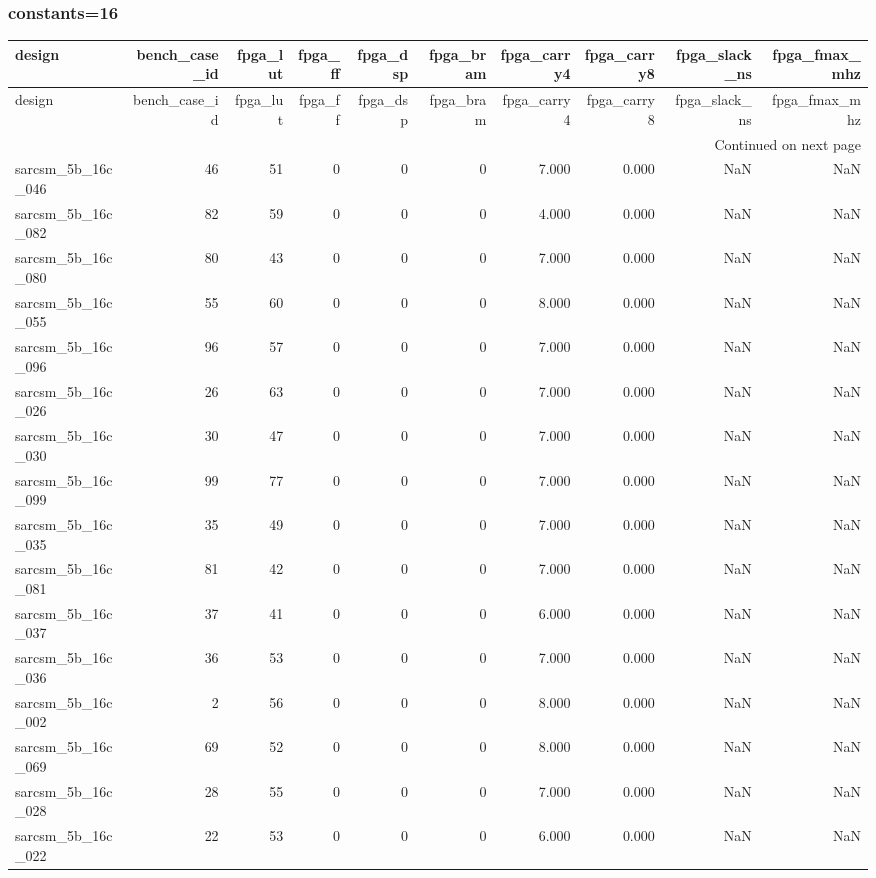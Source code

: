 \documentclass{article}
\begin{document}
\subsubsection*{constants=16}
\begin{longtable}{lrrrrrrrrr}
\toprule
design & bench\_case\_id & fpga\_lut & fpga\_ff & fpga\_dsp & fpga\_bram & fpga\_carry4 & fpga\_carry8 & fpga\_slack\_ns & fpga\_fmax\_mhz \\
\midrule
\endfirsthead
\toprule
design & bench\_case\_id & fpga\_lut & fpga\_ff & fpga\_dsp & fpga\_bram & fpga\_carry4 & fpga\_carry8 & fpga\_slack\_ns & fpga\_fmax\_mhz \\
\midrule
\endhead
\midrule
\multicolumn{10}{r}{Continued on next page} \\
\midrule
\endfoot
\bottomrule
\endlastfoot
sarcsm\_5b\_16c\_046 & 46 & 51 & 0 & 0 & 0 & 7.000 & 0.000 & NaN & NaN \\
sarcsm\_5b\_16c\_082 & 82 & 59 & 0 & 0 & 0 & 4.000 & 0.000 & NaN & NaN \\
sarcsm\_5b\_16c\_080 & 80 & 43 & 0 & 0 & 0 & 7.000 & 0.000 & NaN & NaN \\
sarcsm\_5b\_16c\_055 & 55 & 60 & 0 & 0 & 0 & 8.000 & 0.000 & NaN & NaN \\
sarcsm\_5b\_16c\_096 & 96 & 57 & 0 & 0 & 0 & 7.000 & 0.000 & NaN & NaN \\
sarcsm\_5b\_16c\_026 & 26 & 63 & 0 & 0 & 0 & 7.000 & 0.000 & NaN & NaN \\
sarcsm\_5b\_16c\_030 & 30 & 47 & 0 & 0 & 0 & 7.000 & 0.000 & NaN & NaN \\
sarcsm\_5b\_16c\_099 & 99 & 77 & 0 & 0 & 0 & 7.000 & 0.000 & NaN & NaN \\
sarcsm\_5b\_16c\_035 & 35 & 49 & 0 & 0 & 0 & 7.000 & 0.000 & NaN & NaN \\
sarcsm\_5b\_16c\_081 & 81 & 42 & 0 & 0 & 0 & 7.000 & 0.000 & NaN & NaN \\
sarcsm\_5b\_16c\_037 & 37 & 41 & 0 & 0 & 0 & 6.000 & 0.000 & NaN & NaN \\
sarcsm\_5b\_16c\_036 & 36 & 53 & 0 & 0 & 0 & 7.000 & 0.000 & NaN & NaN \\
sarcsm\_5b\_16c\_002 & 2 & 56 & 0 & 0 & 0 & 8.000 & 0.000 & NaN & NaN \\
sarcsm\_5b\_16c\_069 & 69 & 52 & 0 & 0 & 0 & 8.000 & 0.000 & NaN & NaN \\
sarcsm\_5b\_16c\_028 & 28 & 55 & 0 & 0 & 0 & 7.000 & 0.000 & NaN & NaN \\
sarcsm\_5b\_16c\_022 & 22 & 53 & 0 & 0 & 0 & 6.000 & 0.000 & NaN & NaN \\

\end{longtable}
\end{document}
